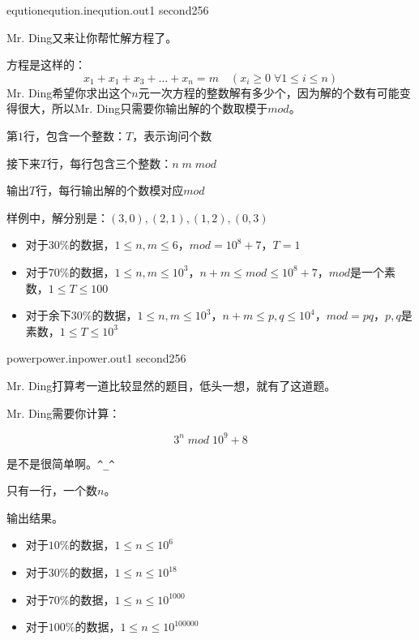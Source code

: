 \documentclass[11pt,a4paper,oneside]{article}
\begin{document}
\begin{problem}{eqution}{eqution.in}{eqution.out}{1 second}{256}
	
	Mr. Ding又来让你帮忙解方程了。
	
	方程是这样的：
	$$
		x_1 + x_1 + x_3 + \dots + x_n = m \quad ( x_i \geq 0 \;  \forall 1 \leq i \leq n  )
	$$
	Mr. Ding希望你求出这个$n$元一次方程的整数解有多少个，因为解的个数有可能变得很大，所以Mr. Ding只需要你输出解的个数取模于$mod$。
	
	\InputFile
	
	第$1$行，包含一个整数：$T$，表示询问个数
	
	接下来$T$行，每行包含三个整数：$n \; m \; mod$
	
	\OutputFile
	
	输出$T$行，每行输出解的个数模对应$ mod $
	
	\Example
	
	\begin{example}
\end{example}

\Note
	样例中，解分别是：$(3,0) , (2,1)  , (1,2) , (0,3)$	
	\begin{itemize}
		\item 对于$30\%$的数据，$ 1 \leq n, m \leq 6 $，$ mod = 10^8 + 7 $，$ T = 1 $
		\item 对于$70\%$的数据，$ 1 \leq n, m \leq 10^3 $，$ n + m \leq mod \leq 10^8 + 7 $，$mod$是一个素数，$ 1 \leq T \leq 100 $
		\item 对于余下$30\%$的数据，$ 1 \leq n, m \leq 10^3$，$ n + m \leq p, q \leq 10^4 $，$mod = pq$，$p, q$是素数，$ 1 \leq T \leq 10^3 $
	\end{itemize}
\end{problem}

\begin{problem}{power}{power.in}{power.out}{1 second}{256}
	
	Mr. Ding打算考一道比较显然的题目，低头一想，就有了这道题。
	
	Mr. Ding需要你计算：
	
	$$
	3^n \; mod \; 10^9 + 8 
	$$
	
	是不是很简单啊。\verb|^_^|
	
	\InputFile
	
	只有一行，一个数$n$。
	
	\OutputFile
	
	输出结果。
	
	\Example
	
	\begin{example}
\end{example}

\Note
\begin{itemize}
	\item 对于$10\%$的数据，$1 \leq n \leq 10^6$
	\item 对于$30\%$的数据，$1 \leq n \leq 10^{18}$
	\item 对于$70\%$的数据，$1 \leq n \leq 10^{1000}$
	\item 对于$100\%$的数据，$1 \leq n \leq 10^{100000}$
\end{itemize}

\end{problem}
\end{document}
